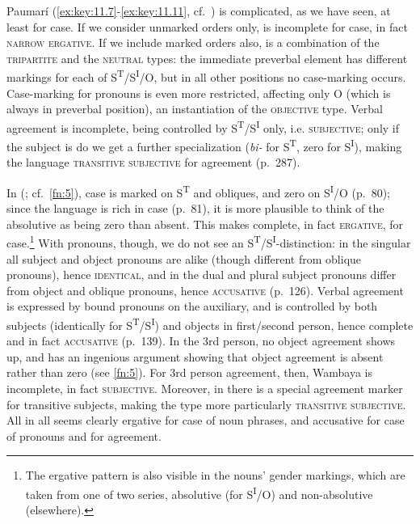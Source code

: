 \documentclass[output=paper]{langsci/langscibook}
\begin{document}
Paumarí (\eqref{ex:key:11.7}-\eqref{ex:key:11.11}, cf.\ \citealt{ChapmanDerbyshire1991}) is complicated, as we
have seen, at least for case. If we consider unmarked orders only,  is
incomplete for case, in fact \textsc{narrow ergative}. If we include marked
orders also,  is a combination of the \textsc{tripartite} and the
\textsc{neutral} types: the immediate preverbal element has different markings
for each of S\textsuperscript{T}/S\textsuperscript{I}/O, but in all other
positions no case-marking occurs. Case-marking for pronouns is even more
restricted, affecting only O (which is always in preverbal position), an
instantiation of the \textsc{objective} type. Verbal agreement is incomplete,
being controlled by S\textsuperscript{T}/S\textsuperscript{I} only, i.e.
\textsc{subjective}; only if the subject is \Tsg{} do we get a further
specialization (\emph{bi-} for S\textsuperscript{T}, zero for
S\textsuperscript{I}), making the language \textsc{transitive subjective} for
\Tsg{} agreement (p.\ 287).

In  (\citealt{Nordlinger1998}; cf.\ \cref{fn:5}), case is marked on
S\textsuperscript{T} and obliques, and zero on S\textsuperscript{I}/O (p.\ 80);
since the language is rich in case (p.\ 81), it is more plausible to think of the
absolutive as being zero than absent. This makes  complete, in fact
\textsc{ergative}, for case.\footnote{The ergative pattern is also visible in
the nouns’ gender markings, which are taken from one of two series, absolutive
(for S\textsuperscript{I}/O) and non-absolutive (elsewhere).\label{fn:13}} With
pronouns, though, we do not see an
S\textsuperscript{T}/S\textsuperscript{I}{}-distinction: in the singular all
subject and object pronouns are alike (though different from oblique pronouns),
hence \textsc{identical}, and in the dual and plural subject pronouns differ
from object and oblique pronouns, hence \textsc{accusative} (p.\ 126). Verbal
agreement is expressed by bound pronouns on the auxiliary, and is controlled by
both subjects (identically for S\textsuperscript{T}/S\textsuperscript{I}) and
objects in first/second person, hence complete and in fact \textsc{accusative}
(p.\ 139). In the 3rd person, no object agreement shows up, and
\citet{Nordlinger1998} has an ingenious argument showing that object agreement
is absent rather than zero (see \cref{fn:5}). For 3rd person agreement, then,
Wambaya is incomplete, in fact \textsc{subjective}. Moreover, in \Tsg{} there
is a special agreement marker for transitive subjects, making the type more
particularly \textsc{transitive subjective}. All in all  seems clearly
ergative for case of noun phrases, and accusative for case of pronouns and for
agreement.
\end{document}
